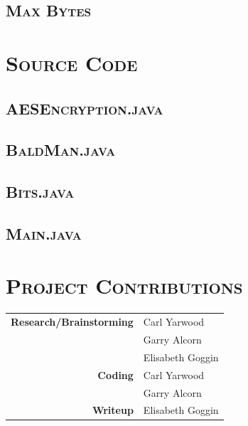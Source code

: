 \documentclass[12pt]{article}
\begin{document}
	\subsection[Max Bytes]{\hspace*{1em}\large{}\selectfont\scshape Max Bytes}
	
	\section[Source Code]{\Large{}\selectfont\scshape Source Code}
	
	\subsection[AESEncryption]{\hspace*{1em}\large{}\selectfont\scshape AESEncryption.java}
	
	
	\subsection[BaldMan]{\hspace*{1em}\large{}\selectfont\scshape BaldMan.java}
	
	
	\subsection[Bits]{\hspace*{1em}\large{}\selectfont\scshape Bits.java}
	
	
	\subsection[Main]{\hspace*{1em}\large{}\selectfont\scshape Main.java}
	
	
	\section[Project Contributions]{\Large{}\selectfont\scshape Project Contributions}
	
	\begin{center}
		{\scshape\small
		\begin{tabular}{r l}
			\bfseries Research/Brainstorming & Carl Yarwood\\
			& Garry Alcorn\\
			& Elisabeth Goggin\\
			\bfseries Coding & Carl Yarwood\\
			& Garry Alcorn\\
			\bfseries Writeup & Elisabeth Goggin\\
		\end{tabular}
		}
	\end{center}
	
\end{document}
